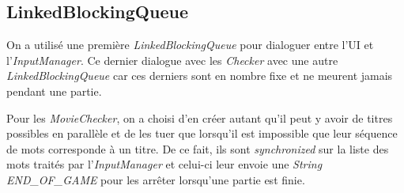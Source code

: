 \documentclass[a4paper,11pt]{article}
\begin{document}
\subsection{LinkedBlockingQueue}
On a utilisé une première \textit{LinkedBlockingQueue} pour dialoguer entre l'UI et l'\textit{InputManager}. Ce dernier dialogue avec les \textit{Checker} avec une autre \textit{LinkedBlockingQueue} car ces derniers sont en nombre fixe et ne meurent jamais pendant une partie.\par
Pour les \textit{MovieChecker}, on a choisi d'en créer autant qu'il peut y avoir de titres possibles en parallèle et de les tuer que lorsqu'il est impossible que leur séquence de mots corresponde à un titre. De ce fait, ils sont \textit{synchronized} sur la liste des mots traités par l'\textit{InputManager} et celui-ci leur envoie une \textit{String END\_OF\_GAME} pour les arrêter lorsqu'une partie est finie.
\end{document}
